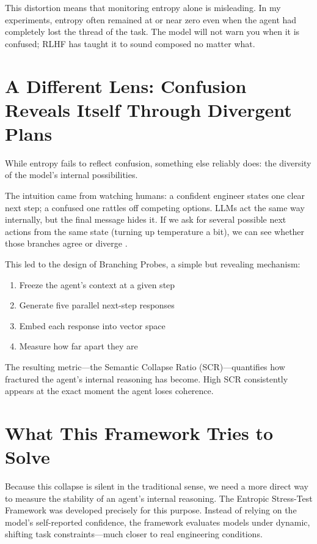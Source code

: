 \documentclass[12pt,a4paper]{report}
\begin{document}
This distortion means that monitoring entropy alone is misleading. In my experiments, entropy often remained at or near zero even when the agent had completely lost the thread of the task. The model will not warn you when it is confused; RLHF has taught it to sound composed no matter what.

\section{A Different Lens: Confusion Reveals Itself Through Divergent Plans}
While entropy fails to reflect confusion, something else reliably does: the diversity of the model’s internal possibilities.

The intuition came from watching humans: a confident engineer states one clear next step; a confused one rattles off competing options. LLMs act the same way internally, but the final message hides it. If we ask for several possible next actions from the same state (turning up temperature a bit), we can see whether those branches agree or diverge \cite{Zhou2024Consistency}.

This led to the design of Branching Probes, a simple but revealing mechanism:
\begin{enumerate}
    \item Freeze the agent’s context at a given step
    \item Generate five parallel next-step responses
    \item Embed each response into vector space
    \item Measure how far apart they are
\end{enumerate}

The resulting metric—the Semantic Collapse Ratio (SCR)—quantifies how fractured the agent’s internal reasoning has become. High SCR consistently appears at the exact moment the agent loses coherence.

\section{What This Framework Tries to Solve}
Because this collapse is silent in the traditional sense, we need a more direct way to measure the stability of an agent’s internal reasoning. The Entropic Stress-Test Framework was developed precisely for this purpose. Instead of relying on the model’s self-reported confidence, the framework evaluates models under dynamic, shifting task constraints—much closer to real engineering conditions.
\end{document}
